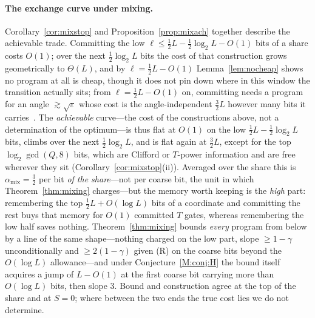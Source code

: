 \documentclass[aps,prx,twocolumn,superscriptaddress,nofootinbib,longbibliography]{revtex4-2}
\theoremstyle{plain}
\theoremstyle{definition}
\theoremstyle{remark}
\begin{document}
\paragraph{The exchange curve under mixing.} Corollary~\ref{cor:mixstop} and Proposition~\ref{prop:mixach} together describe the achievable trade. Committing the low $\ell\le\tfrac12L-\tfrac12\log_2L-O(1)$ bits of a share costs $O(1)$; over the next $\tfrac12\log_2L$ bits the cost of that construction grows geometrically to $\Theta(L)$, and by $\ell=\tfrac12L-O(1)$ Lemma~\ref{lem:nocheap} shows no program at all is cheap, though it does not pin down where in this window the transition actually sits; from $\ell=\tfrac12L-O(1)$ on, committing needs a program for an angle $\gtrsim\sqrt\varepsilon$ whose cost is the angle-independent $\tfrac32L$ however many bits it carries~\cite{KLMPP,Bothe}. The \emph{achievable} curve---the cost of the constructions above, not a determination of the optimum---is thus flat at $O(1)$ on the low $\tfrac12L-\tfrac12\log_2L$ bits, climbs over the next $\tfrac12\log_2L$, and is flat again at $\tfrac32L$, except for the top $\log_2\gcd(Q,8)$ bits, which are Clifford or $T$-power information and are free wherever they sit (Corollary~\ref{cor:mixstop}(ii)). Averaged over the share this is $\alpha_{\mathrm{mix}}=\tfrac32$ per bit \emph{of the share}---not per coarse bit, the unit in which Theorem~\ref{thm:mixing} charges---but the memory worth keeping is the \emph{high} part: remembering the top $\tfrac12L+O(\log L)$ bits of a coordinate and committing the rest buys that memory for $O(1)$ committed $T$ gates, whereas remembering the low half saves nothing. Theorem~\ref{thm:mixing} bounds \emph{every} program from below by a line of the same shape---nothing charged on the low part, slope $\ge1-\gamma$ unconditionally and $\ge2(1-\gamma)$ given (R) on the coarse bits beyond the $O(\log L)$ allowance---and under Conjecture~\ref{M:conj:H} the bound itself acquires a jump of $L-O(1)$ at the first coarse bit carrying more than $O(\log L)$ bits, then slope $3$. Bound and construction agree at the top of the share and at $S=0$; where between the two ends the true cost lies we do not determine.
\end{document}
